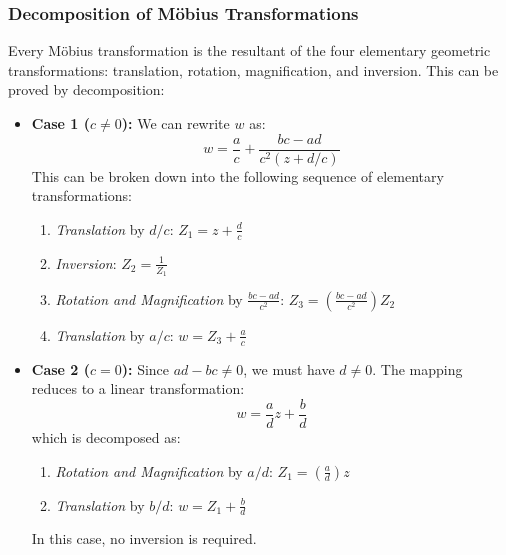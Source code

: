 \documentclass[12pt,a4paper]{article}
\begin{document}
\subsubsection{Decomposition of Möbius Transformations}
Every Möbius transformation is the resultant of the four elementary geometric transformations: translation, rotation, magnification, and inversion. This can be proved by decomposition:
\begin{itemize}
    \item \textbf{Case 1 ($c \neq 0$):} We can rewrite $w$ as:
    \begin{equation}
        w = \frac{a}{c} + \frac{bc - ad}{c^2 \left( z + d/c \right)}
    \end{equation}
    This can be broken down into the following sequence of elementary transformations:
    \begin{enumerate}
        \item \textit{Translation} by $d/c$: $Z_1 = z + \frac{d}{c}$
        \item \textit{Inversion}: $Z_2 = \frac{1}{Z_1}$
        \item \textit{Rotation and Magnification} by $\frac{bc - ad}{c^2}$: $Z_3 = \left(\frac{bc - ad}{c^2}\right) Z_2$
        \item \textit{Translation} by $a/c$: $w = Z_3 + \frac{a}{c}$
    \end{enumerate}
    \item \textbf{Case 2 ($c = 0$):} Since $ad - bc \neq 0$, we must have $d \neq 0$. The mapping reduces to a linear transformation:
    \begin{equation}
        w = \frac{a}{d}z + \frac{b}{d}
    \end{equation}
    which is decomposed as:
    \begin{enumerate}
        \item \textit{Rotation and Magnification} by $a/d$: $Z_1 = \left(\frac{a}{d}\right) z$
        \item \textit{Translation} by $b/d$: $w = Z_1 + \frac{b}{d}$
    \end{enumerate}
    In this case, no inversion is required.
\end{itemize}
\end{document}
